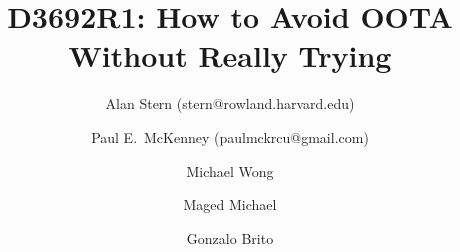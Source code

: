 

\usepackage[T1]{fontenc} %
\usepackage{textcomp} %

\usepackage{microtype}

\usepackage{lscape}
\usepackage{fancyhdr}
\usepackage{subfigure}
\usepackage{url}
\usepackage{graphics}
\usepackage{ifthen}
\usepackage{float}
\usepackage{listings}
\lstset{basicstyle=\ttfamily}



\DeclareUrlCommand\email{}

\pagestyle{plain}



\title{D3692R1: How to Avoid OOTA Without Really Trying}

\newcommand{\co}[1]{\lstinline[breaklines=yes,breakatwhitespace=yes]{#1}}

\author{
Alan Stern (stern@rowland.harvard.edu) \and
Paul E.~McKenney (paulmckrcu@gmail.com) \and
Michael Wong \and
Maged Michael \and
Gonzalo Brito
}

